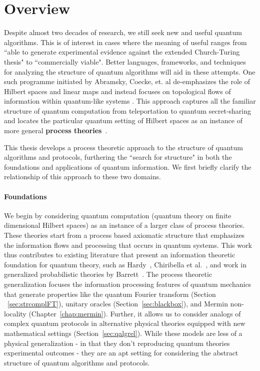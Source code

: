 \chapter{Overview}

Despite almost two decades of research, we still seek new and useful quantum algorithms.  This is of interest in cases where the meaning of useful ranges from ``able to generate experimental evidence against the extended Church-Turing thesis" to ``commercially viable". Better languages, frameworks, and techniques for analyzing the structure of quantum algorithms will aid in these attempts.  One such  programme initiated by Abramsky, Coecke, et. al de-emphasizes the role of Hilbert spaces and linear maps and instead focuses on topological flows of information within quantum-like systems
\cite{abramsky2008categorical,coecke2011interacting,coecke2013new}. This approach captures all the familiar structure of quantum computation from teleportation  to quantum secret-sharing and locates the particular quantum setting of Hilbert spaces as an instance of more general
\textbf{process theories}~\cite{coecke2015generalised,qcs-notes,coecke2011categories}. 

This thesis develops a process theoretic approach to the structure of quantum algorithms and protocols, furthering the ``search for structure" in both the foundations and applications of quantum information. We first briefly clarify the relationship of this approach to these two domains.
 
\subsubsection*{Foundations}

We begin by considering quantum computation (quantum theory on finite dimensional Hilbert spaces) as an instance of a larger class of process theories. These theories start from a process based axiomatic structure that emphasizes the information flows and processing that occurs in quantum systems. This work thus contributes to existing literature that present an information theoretic foundation for quantum theory, such as Hardy~\cite{hardy2001quantum}, Chiribella et al.~\cite{chiribella2011informational}, and work in generalized probabilistic theories by Barrett~\cite{barrett2007information}.  The process theoretic generalization focuses the information processing features of quantum mechanics that generate properties like the quantum Fourier transform (Section ~\ref{sec:strcomplFT}), unitary oracles (Section~\ref{sec:blackbox}), and Mermin non-locality (Chapter~\ref{chap:mermin}). Further, it allows us to consider analogs of complex quantum protocols in alternative physical theories equipped with new mathematical settings (Section~\ref{sec:qalgrel}). While these models are less of a physical generalization - in that they don't reproducing quantum theories experimental outcomes - they are an apt setting for considering the abstract structure of quantum algorithms and protocols.

